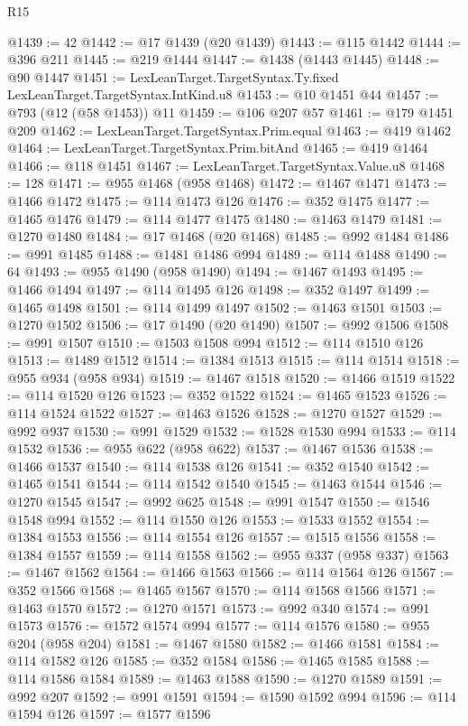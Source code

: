 \begin{lexlean}{R15}
\begin{coremodule}
@1439 := 42
@1442 := @17 @1439 (@20 @1439)
@1443 := @115 @1442
@1444 := @396 @211
@1445 := @219 @1444
@1447 := @1438 (@1443 @1445)
@1448 := @90 @1447
@1451 := LexLeanTarget.TargetSyntax.Ty.fixed LexLeanTarget.TargetSyntax.IntKind.u8
@1453 := @10 @1451 @44
@1457 := @793 (@12 (@58 @1453)) @11
@1459 := @106 @207 @57
@1461 := @179 @1451 @209
@1462 := LexLeanTarget.TargetSyntax.Prim.equal
@1463 := @419 @1462
@1464 := LexLeanTarget.TargetSyntax.Prim.bitAnd
@1465 := @419 @1464
@1466 := @118 @1451
@1467 := LexLeanTarget.TargetSyntax.Value.u8
@1468 := 128
@1471 := @955 @1468 (@958 @1468)
@1472 := @1467 @1471
@1473 := @1466 @1472
@1475 := @114 @1473 @126
@1476 := @352 @1475
@1477 := @1465 @1476
@1479 := @114 @1477 @1475
@1480 := @1463 @1479
@1481 := @1270 @1480
@1484 := @17 @1468 (@20 @1468)
@1485 := @992 @1484
@1486 := @991 @1485
@1488 := @1481 @1486 @994
@1489 := @114 @1488
@1490 := 64
@1493 := @955 @1490 (@958 @1490)
@1494 := @1467 @1493
@1495 := @1466 @1494
@1497 := @114 @1495 @126
@1498 := @352 @1497
@1499 := @1465 @1498
@1501 := @114 @1499 @1497
@1502 := @1463 @1501
@1503 := @1270 @1502
@1506 := @17 @1490 (@20 @1490)
@1507 := @992 @1506
@1508 := @991 @1507
@1510 := @1503 @1508 @994
@1512 := @114 @1510 @126
@1513 := @1489 @1512
@1514 := @1384 @1513
@1515 := @114 @1514
@1518 := @955 @934 (@958 @934)
@1519 := @1467 @1518
@1520 := @1466 @1519
@1522 := @114 @1520 @126
@1523 := @352 @1522
@1524 := @1465 @1523
@1526 := @114 @1524 @1522
@1527 := @1463 @1526
@1528 := @1270 @1527
@1529 := @992 @937
@1530 := @991 @1529
@1532 := @1528 @1530 @994
@1533 := @114 @1532
@1536 := @955 @622 (@958 @622)
@1537 := @1467 @1536
@1538 := @1466 @1537
@1540 := @114 @1538 @126
@1541 := @352 @1540
@1542 := @1465 @1541
@1544 := @114 @1542 @1540
@1545 := @1463 @1544
@1546 := @1270 @1545
@1547 := @992 @625
@1548 := @991 @1547
@1550 := @1546 @1548 @994
@1552 := @114 @1550 @126
@1553 := @1533 @1552
@1554 := @1384 @1553
@1556 := @114 @1554 @126
@1557 := @1515 @1556
@1558 := @1384 @1557
@1559 := @114 @1558
@1562 := @955 @337 (@958 @337)
@1563 := @1467 @1562
@1564 := @1466 @1563
@1566 := @114 @1564 @126
@1567 := @352 @1566
@1568 := @1465 @1567
@1570 := @114 @1568 @1566
@1571 := @1463 @1570
@1572 := @1270 @1571
@1573 := @992 @340
@1574 := @991 @1573
@1576 := @1572 @1574 @994
@1577 := @114 @1576
@1580 := @955 @204 (@958 @204)
@1581 := @1467 @1580
@1582 := @1466 @1581
@1584 := @114 @1582 @126
@1585 := @352 @1584
@1586 := @1465 @1585
@1588 := @114 @1586 @1584
@1589 := @1463 @1588
@1590 := @1270 @1589
@1591 := @992 @207
@1592 := @991 @1591
@1594 := @1590 @1592 @994
@1596 := @114 @1594 @126
@1597 := @1577 @1596

\end{coremodule}
\end{lexlean}
